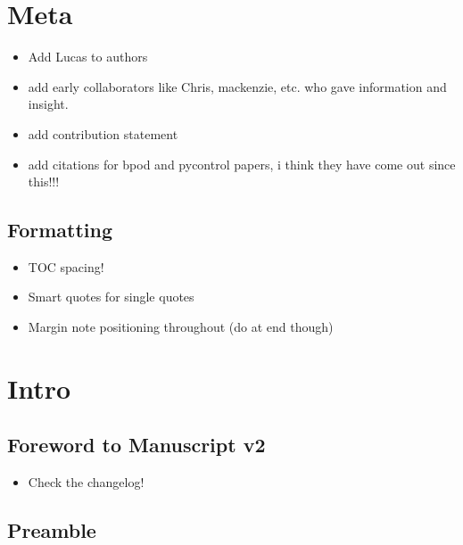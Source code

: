 \section{Meta}

\begin{itemize}
\item Add Lucas to authors
\item add early collaborators like Chris, mackenzie, etc. who gave information and insight.
\item add contribution statement
\item add citations for bpod and pycontrol papers, i think they have come out since this!!!
\end{itemize}

\subsection{Formatting}

\begin{itemize}
\item TOC spacing!
\item Smart quotes for single quotes
\item Margin note positioning throughout (do at end though)
\end{itemize}

\section{Intro}

\subsection{Foreword to Manuscript v2}

\begin{itemize}
\item Check the changelog!
\end{itemize}

\subsection{Preamble}

